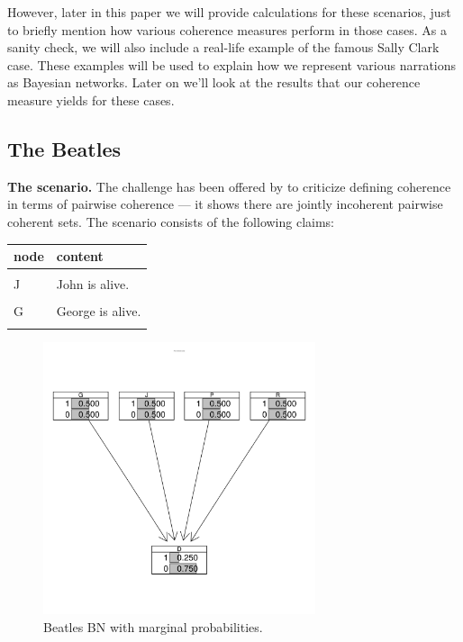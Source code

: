 \documentclass[10pt,]{scrartcl}
\begin{document}
However, later in this paper we will  provide calculations for these scenarios, just to briefly mention how various coherence measures  perform in those cases.  As a sanity check, we will also include a real-life example of the famous Sally Clark case. These examples will be used to explain how we represent various narrations as Bayesian networks. Later on we'll look at the results that  our coherence measure yields for these cases.





\subsection{The Beatles}

\textbf{The scenario.} The challenge has been offered by \citet[339]{shogenji1999conducive} to criticize defining coherence in terms of pairwise
coherence --- it shows there are jointly incoherent pairwise coherent
sets. The scenario consists of the following claims:

\begin{table}[H]
\centering
\begin{tabular}{ll}
\toprule
node & content\\
\midrule
\cellcolor{gray!6}{D} & \cellcolor{gray!6}{Exactly one of the Beatles (John, Paul, George and Ringo) is dead.}\\
J & John is alive.\\
\cellcolor{gray!6}{P} & \cellcolor{gray!6}{Paul is alive.}\\
G & George is alive.\\
\cellcolor{gray!6}{R} & \cellcolor{gray!6}{Ringo is alive.}\\
\bottomrule
\end{tabular}
\end{table}



\begin{figure}[H]
\hspace{25mm}
\includegraphics[width =8cm]{BeatlesBN.png}
\caption{Beatles BN with marginal probabilities.}
\label{fig:BeatlesBN3}
\end{figure}
\end{document}
